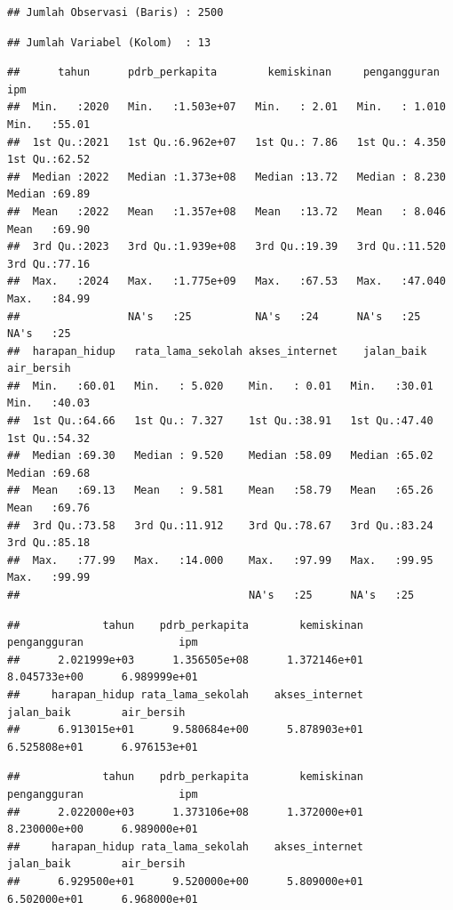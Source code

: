 \documentclass[
  12pt,
]{article}
\begin{document}
\begin{verbatim}
## Jumlah Observasi (Baris) : 2500
\end{verbatim}

\begin{verbatim}
## Jumlah Variabel (Kolom)  : 13
\end{verbatim}

\begin{verbatim}
##      tahun      pdrb_perkapita        kemiskinan     pengangguran         ipm       
##  Min.   :2020   Min.   :1.503e+07   Min.   : 2.01   Min.   : 1.010   Min.   :55.01  
##  1st Qu.:2021   1st Qu.:6.962e+07   1st Qu.: 7.86   1st Qu.: 4.350   1st Qu.:62.52  
##  Median :2022   Median :1.373e+08   Median :13.72   Median : 8.230   Median :69.89  
##  Mean   :2022   Mean   :1.357e+08   Mean   :13.72   Mean   : 8.046   Mean   :69.90  
##  3rd Qu.:2023   3rd Qu.:1.939e+08   3rd Qu.:19.39   3rd Qu.:11.520   3rd Qu.:77.16  
##  Max.   :2024   Max.   :1.775e+09   Max.   :67.53   Max.   :47.040   Max.   :84.99  
##                 NA's   :25          NA's   :24      NA's   :25       NA's   :25     
##  harapan_hidup   rata_lama_sekolah akses_internet    jalan_baik      air_bersih   
##  Min.   :60.01   Min.   : 5.020    Min.   : 0.01   Min.   :30.01   Min.   :40.03  
##  1st Qu.:64.66   1st Qu.: 7.327    1st Qu.:38.91   1st Qu.:47.40   1st Qu.:54.32  
##  Median :69.30   Median : 9.520    Median :58.09   Median :65.02   Median :69.68  
##  Mean   :69.13   Mean   : 9.581    Mean   :58.79   Mean   :65.26   Mean   :69.76  
##  3rd Qu.:73.58   3rd Qu.:11.912    3rd Qu.:78.67   3rd Qu.:83.24   3rd Qu.:85.18  
##  Max.   :77.99   Max.   :14.000    Max.   :97.99   Max.   :99.95   Max.   :99.99  
##                                    NA's   :25      NA's   :25
\end{verbatim}

\begin{verbatim}
##             tahun    pdrb_perkapita        kemiskinan      pengangguran               ipm 
##      2.021999e+03      1.356505e+08      1.372146e+01      8.045733e+00      6.989999e+01 
##     harapan_hidup rata_lama_sekolah    akses_internet        jalan_baik        air_bersih 
##      6.913015e+01      9.580684e+00      5.878903e+01      6.525808e+01      6.976153e+01
\end{verbatim}

\begin{verbatim}
##             tahun    pdrb_perkapita        kemiskinan      pengangguran               ipm 
##      2.022000e+03      1.373106e+08      1.372000e+01      8.230000e+00      6.989000e+01 
##     harapan_hidup rata_lama_sekolah    akses_internet        jalan_baik        air_bersih 
##      6.929500e+01      9.520000e+00      5.809000e+01      6.502000e+01      6.968000e+01
\end{verbatim}
\end{document}
